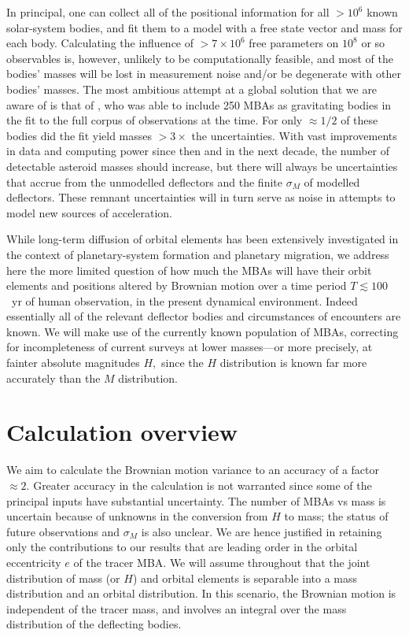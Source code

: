 \documentclass[linenumbers, onecolumn]{aastex631}
\begin{document}
In principal, one can collect all of the positional information for
all $>10^6$ known solar-system bodies, and fit them to a model with
a free state vector and mass for each body.  Calculating the influence
of $>7\times10^6$ free parameters on $10^8$ or so observables is,
however, unlikely to be computationally feasible, and most of the
bodies' masses will be lost in measurement noise and/or be degenerate
with other bodies' masses.  The most ambitious attempt at a global
solution that we are aware of is that of \citet{goffin}, who was able
to include 250 MBAs as gravitating bodies in the fit to the full
corpus of observations at the time.  For only $\approx 1/2$ of these
bodies did the fit yield masses $>3\times$ the uncertainties.  With
vast improvements in data and computing power since then and in the
next decade, the number of detectable
asteroid masses should increase, but there will always be
uncertainties that accrue from the unmodelled deflectors and the
finite $\sigma_M$ of modelled deflectors.  These remnant uncertainties
will in turn serve as noise in attempts to model new sources of
acceleration.

While long-term diffusion of orbital elements has been extensively
investigated in the context of planetary-system formation and
planetary migration, we address here the more limited question of how
much the MBAs will have their orbit elements and positions altered
by Brownian motion over a time period $T \lesssim100$~yr of human
observation, in the present dynamical environment.  Indeed essentially
all of the relevant deflector bodies and circumstances of encounters
are known.  We will make use
of the currently known population of MBAs, correcting for
incompleteness of current surveys at lower masses---or more precisely,
at fainter absolute magnitudes $H,$ since the $H$ distribution is
known far more accurately than the $M$ distribution.


\section{Calculation overview}
We aim to calculate the Brownian motion variance to an accuracy of a
factor $\approx 2.$
Greater accuracy in the calculation is not warranted
since some of the principal inputs have substantial uncertainty.  The
number of MBAs vs mass is 
uncertain because of unknowns in the conversion
from $H$ to mass; the status of future observations and $\sigma_M$ is
also unclear.  We are hence justified in retaining only the
contributions to our results that are leading
order in the orbital eccentricity $e$ of the tracer MBA.
We will assume throughout that the joint
distribution of mass (or $H$) and orbital elements is separable into a
mass distribution and an orbital distribution.  In this scenario, the
Brownian motion is independent of the tracer mass, and involves an
integral over the mass distribution of the deflecting bodies.
\end{document}
